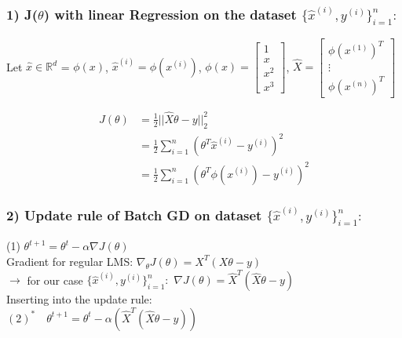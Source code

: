 \begin{answer}
    \subsubsection*{1) J($\theta$) with linear Regression on the dataset $\{\hat{x}^{(i)}, y^{(i)}\}_{i=1}^n:$}

    Let $\hat{x} \in \mathbb{R}^d$ = $\phi(x)$,
        $\hat{x}^{(i)} = \phi(x^{(i)})$,
        $\phi(x) = \begin{bmatrix} 1 \\ x \\ x^2 \\ x^3 \end{bmatrix}$,
        $\hat{X} = \begin{bmatrix} \phi(x^{(1)})^T \\ \vdots \\ \phi(x^{(n)})^T \end{bmatrix}$
    
    \setcounter{equation}{0}
    \begin{align}
        J(\theta) &= \frac{1}{2} ||\hat{X}\theta - y||_2^2 \\
        &= \frac{1}{2} \sum_{i=1}^n (\theta^T\hat{x}^{(i)} - y^{(i)})^2 \\
        &= \frac{1}{2} \sum_{i=1}^n (\theta^T\phi(x^{(i)}) - y^{(i)})^2
    \end{align}
    
    \subsubsection*{2) Update rule of Batch GD on dataset $\{ \hat{x}^{(i)}, y^{(i)}\}_{i=1}^n:$}
    (1) $\theta^{t+1} = \theta^t - \alpha \nabla J(\theta)$ \\
    Gradient for regular LMS: $\nabla_\theta J(\theta) = X^T(X\theta - y)$ \\
    $\to$ for our case $\{ \hat{x}^{(i)}, y^{(i)}\}_{i=1}^n:$
    $\nabla J(\theta) = \hat{X}^T(\hat{X}\theta - y)$ \\
    
    Inserting into the update rule: \\
    $(2)^* \quad \theta^{t+1} = \theta^t - \alpha(\hat{X}^T(\hat{X}\theta-y))$
    
\end{answer}
